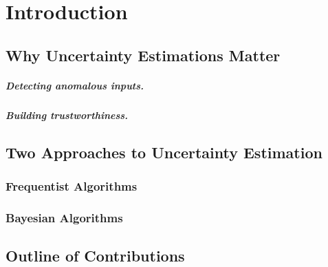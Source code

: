 \chapter{Introduction}

\section{Why Uncertainty Estimations Matter}

\paragraph{Detecting anomalous inputs.}

\paragraph{Building trustworthiness.}

\section{Two Approaches to Uncertainty Estimation}

\subsection{Frequentist Algorithms}

\subsection{Bayesian Algorithms}

\section{Outline of Contributions}
